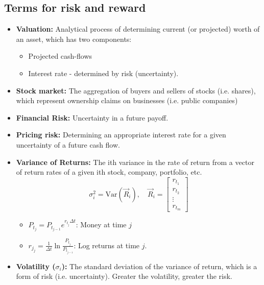 \subsection{Terms for risk and reward}
\begin{terminology}
    \begin{itemize}
        \item \textbf{Valuation:} Analytical process of determining current (or projected) worth of an asset, which has two components:
        \begin{itemize}
            \item Projected cash-flows
            \item Interest rate - determined by risk (uncertainty).
        \end{itemize}

        \item \textbf{Stock market:} The aggregation of buyers and sellers of stocks (i.e. shares), which represent ownership claims on businesses (i.e. public companies)

        \item \textbf{Financial Risk:} Uncertainty in a future payoff.
        \item \textbf{Pricing risk:} Determining an appropriate interest rate for a given uncertainty of a future cash flow. 

        
        \item \textbf{Variance of Returns:} The ith variance in the rate of return from a vector of return rates of a given ith stock, company, portfolio, etc.
        \[
        \sigma_i^2 = \text{Var}(\vec{R}_i), \quad \vec{R}_i = \begin{bmatrix}
        r_{t_1} \\
        r_{t_2} \\
        \vdots \\
        r_{t_m}
        \end{bmatrix}
        \]
        \begin{itemize}
            \item $P_{t_j} = P_{t_{j-1}} e^{r_{t_j} \Delta t}$: Money at time $j$
            \item $r_{j_j} = \frac{1}{\Delta t} \ln \frac{P_{t_j}}{P_{t_{j-1}}}$: Log returns at time $j$.
        \end{itemize}
        
        \item \textbf{Volatility ($\sigma_i$):} The standard deviation of the variance of return, which is a form of risk (i.e. uncertainty). Greater the volatility, greater the risk.
    \end{itemize}            
\end{terminology}

